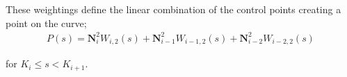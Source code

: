 These weightings define the linear combination of the control points creating a point on the curve;
\begin{align*}
P(s) = \textbf{N}_i^2W_{i,2}(s) + \textbf{N}_{i-1}^2W_{i-1,2}(s) + \textbf{N}_{i-2}^2W_{i-2,2}(s)
\end{align*}

for $K_i \leq s < K_{i+1}$.